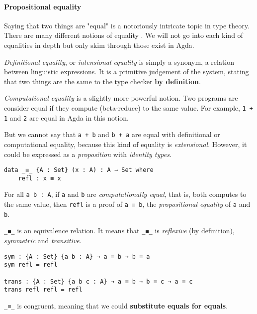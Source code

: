 \documentclass[../thesis.tex]{subfiles}
\begin{document}
\paragraph{Propositional equality}

Saying that two things are "equal" is a notoriously intricate topic in type theory.
There are many different notions of equality
\cite{equality}. We will not go
into each kind of equalities in depth but only skim through those exist in Agda.

\textit{Definitional equality}, or \textit{intensional equality} is simply a
synonym, a relation between linguistic expressions. It is a primitive judgement
of the system, stating that two things are the same to the type checker
\textbf{by definition}.

\textit{Computational equality} is a slightly more powerful notion.
Two programs are consider equal if they compute (beta-reduce) to the same value.
For example, {\lstinline|1 + 1|} and {\lstinline|2|} are equal in Agda in this notion.

But we cannot say that {\lstinline|a + b|} and {\lstinline|b + a|}
are equal with definitional or computational equality, because this kind of equality
is \textit{extensional}.  However, it could be expressed as a \textit{proposition}
with \textit{identity types}.

\begin{lstlisting}
data _≡_ {A : Set} (x : A) : A → Set where
    refl : x ≡ x
\end{lstlisting}

For all {\lstinline|a b : A|}, if {\lstinline|a|} and {\lstinline|b|} are
\textit{computationally equal}, that is, both computes to the same value,
then {\lstinline|refl|} is a proof of {\lstinline|a ≡ b|},
the \textit{propositional equality} of {\lstinline|a|} and {\lstinline|b|}.


{\lstinline|_≡_|} is an equivalence relation. It means that {\lstinline|_≡_|}
is \textit{reflexive} (by definition), \textit{symmetric} and \textit{transitive}.

\begin{lstlisting}
sym : {A : Set} {a b : A} → a ≡ b → b ≡ a
sym refl = refl

trans : {A : Set} {a b c : A} → a ≡ b → b ≡ c → a ≡ c
trans refl refl = refl
\end{lstlisting}

{\lstinline|_≡_|} is congruent, meaning that we could \textbf{substitute equals for equals}.
\end{document}
